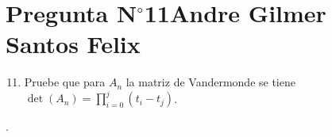 \section{Pregunta N$^{\circ}$11\qquad Andre Gilmer Santos Felix}

\begin{frame}
	\begin{enumerate}\setcounter{enumi}{10}
		\item

		      Pruebe que para $A_{n}$ la matriz de Vandermonde se
		      tiene
		      \begin{math}
			      \det\left(A_{n}\right)=
			      \prod\limits_{i=0}^{j}
			      \left(t_{i}-t_{j}\right)
		      \end{math}.
	\end{enumerate}

	\begin{solution}
		.
	\end{solution}
\end{frame}
